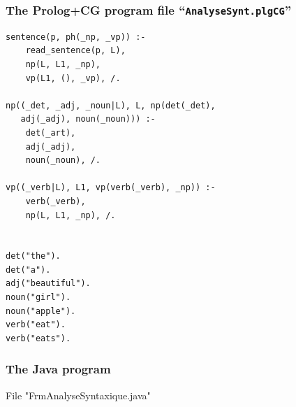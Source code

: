 \documentclass{book}
\begin{document}
\subsubsection{The Prolog+CG program file ``\texttt{AnalyseSynt.plgCG}''}


\begin{verbatim}
sentence(p, ph(_np, _vp)) :-
    read_sentence(p, L),
    np(L, L1, _np),
    vp(L1, (), _vp), /.

np((_det, _adj, _noun|L), L, np(det(_det), 
   adj(_adj), noun(_noun))) :-
    det(_art),
    adj(_adj),
    noun(_noun), /.

vp((_verb|L), L1, vp(verb(_verb), _np)) :-
    verb(_verb),
    np(L, L1, _np), /.


det("the").
det("a").
adj("beautiful").
noun("girl").
noun("apple").
verb("eat").
verb("eats").
\end{verbatim}


\subsubsection{The Java program}

File "FrmAnalyseSyntaxique.java"
\end{document}
